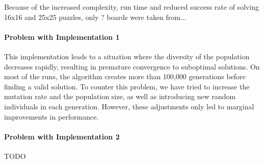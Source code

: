 Because of the increased complexity, run time and reduced success rate of solving 16x16 and 25x25 puzzles, only ? boards were taken from...


\paragraph{Problem with Implementation 1}
This implementation leads to a situation where the diversity of the population decreases rapidly, resulting in premature convergence to suboptimal solutions. On most of the runs, the algorithm creates more than 100,000 generations before finding a valid solution.  
To counter this problem, we have tried to increase the mutation rate and the population size, as well as introducing new random individuals in each generation. However, these adjustments only led to marginal improvements in performance.

\paragraph{Problem with Implementation 2} TODO